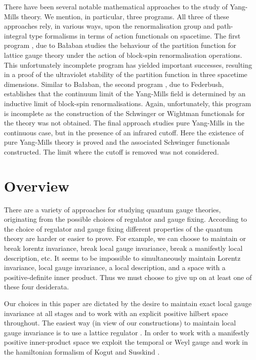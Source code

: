 \documentclass[12pt]{amsart}
\theoremstyle{definition}
\theoremstyle{remark}
\numberwithin{equation}{section}
\begin{document}
There have been several notable mathematical approaches to the study of Yang-Mills theory. We mention, in particular, three programs. All three of these approaches rely, in various ways, upon the renormalisation group \cite{wilson:1975a} and path-integral type formalisms in terms of action functionals on spacetime. The first program \cites{balaban:1985a,balaban:1988a,balaban:1984a,balaban:1984b,balaban:1985b,balaban:1985c,balaban:1985d,balaban:1989a,balaban:1989b,balaban:1987a,balaban:1988b}, due to Ba{\l}aban studies the behaviour of the partition function for lattice gauge theory under the action of block-spin renormalisation operations. This unfortunately incomplete program has yielded important successes, resulting in a proof of the ultraviolet stability of the partition function \cite{balaban:1985d} in three spacetime dimensions. Similar to Ba{\l}aban, the second program \cites{federbush:1987a,federbush:1986a,federbush:1987b,federbush:1987c,federbush:1988a,federbush:1990a}, due to Federbush, establishes that the continuum limit of the Yang-Mills field is determined by an inductive limit of block-spin renormalisations. Again, unfortunately, this program is incomplete as the construction of the Schwinger or Wightman functionals for the theory was not obtained.  The final approach \cite{magnen:1993a} studies pure Yang-Mills in the continuous case, but in the presence of an infrared cutoff. Here the existence of pure Yang-Mills theory is proved and the associated Schwinger functionals constructed. The limit where the cutoff is removed was not considered.


\section{Overview}
There are a variety of approaches for studying quantum gauge theories, originating from the possible choices of regulator and gauge fixing. According to the choice of regulator and gauge fixing different properties of the quantum theory are harder or easier to prove. For example, we can choose to maintain or break lorentz invariance, break local gauge invariance, break a manifestly local description, etc. It seems to be impossible to simultaneously maintain Lorentz invariance, local gauge invariance, a local description, and a space with a positive-definite inner product. Thus we must choose to give up on at least one of these four desiderata. 

Our choices in this paper are dictated by the desire to maintain exact local gauge invariance at all stages and to work with an explicit positive hilbert space throughout. The easiest way (in view of our constructions) to maintain local gauge invariance is to use a lattice regulator \cite{wilson:1974b, creutz:1985a}. In order to work with a manifestly positive inner-product space we exploit the temporal or Weyl gauge and work in the hamiltonian formalism of Kogut and Susskind \cite{kogut:1975a}. 
\end{document}
